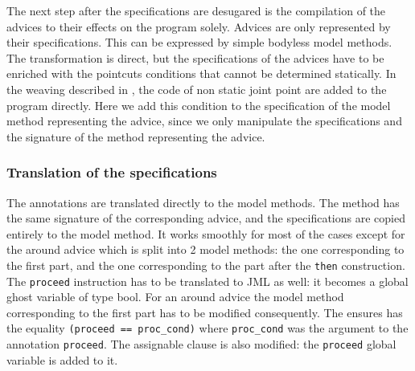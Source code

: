 The next step after the specifications are desugared is the
compilation of the advices to their effects on the program solely.
Advices are only represented by their specifications.
This can be expressed by simple bodyless model methods.
The transformation is direct, but the specifications of the advices
have to be enriched with the pointcuts conditions that cannot be
determined statically. 
In the weaving described in \cite{weaving04}, the code
of non static joint point are added to the program directly.
Here we add this condition to the specification of the model method 
representing the advice, since we only manipulate the specifications
and the signature of the method representing the advice.



\subsubsection{Translation of the specifications}
The annotations are translated directly to the model methods. The
method has the same signature of the corresponding advice, and the
specifications are copied entirely to the model method. It works
smoothly for most of the cases except for the around advice which is
split into 2 model methods: the one corresponding to the first part,
and the one corresponding to the part after the {\tt then}
construction.  The {\tt proceed} instruction has to be translated to
 JML as well: it becomes a global ghost variable of type bool.  For an
 around advice the model method corresponding to the first part has to
 be modified consequently.  The ensures has the equality {\tt (proceed
 == proc\_cond)} where {\tt proc\_cond} was the argument to the
 annotation {\tt proceed}. The assignable clause is also modified: the
 {\tt proceed} global variable is added to it.
